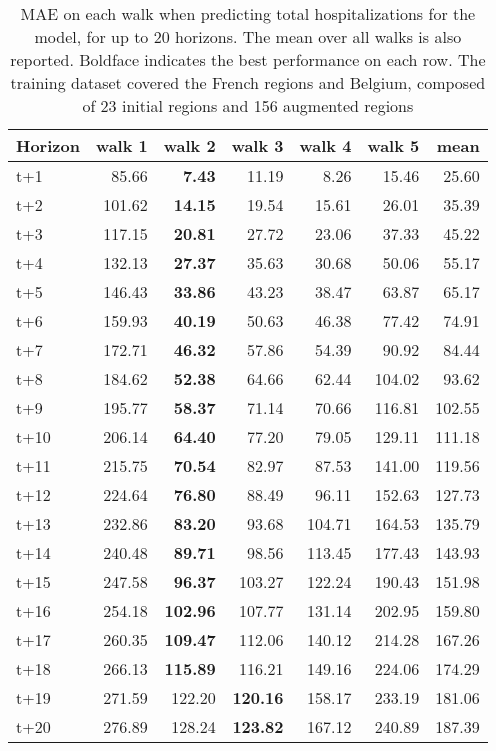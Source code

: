 \begin{table}[H]
\centering
\caption{MAE on each walk when predicting total hospitalizations for the model, for up to 20 horizons. The mean over all walks is also reported. Boldface indicates the best performance on each row. The training dataset covered the French regions and Belgium, composed of 23 initial regions and 156 augmented regions }
\label{tab:MAE_walk_baseline}
\begin{tabular}{lrrrrrr}
\toprule
Horizon &  walk 1 &  walk 2 &  walk 3 &  walk 4 &  walk 5 &   mean \\
\midrule
t+1  & 85.66  & \textbf{7.43}  & 11.19  & 8.26  & 15.46  & 25.60  \\
t+2  & 101.62  & \textbf{14.15}  & 19.54  & 15.61  & 26.01  & 35.39  \\
t+3  & 117.15  & \textbf{20.81}  & 27.72  & 23.06  & 37.33  & 45.22  \\
t+4  & 132.13  & \textbf{27.37}  & 35.63  & 30.68  & 50.06  & 55.17  \\
t+5  & 146.43  & \textbf{33.86}  & 43.23  & 38.47  & 63.87  & 65.17  \\
t+6  & 159.93  & \textbf{40.19}  & 50.63  & 46.38  & 77.42  & 74.91  \\
t+7  & 172.71  & \textbf{46.32}  & 57.86  & 54.39  & 90.92  & 84.44  \\
t+8  & 184.62  & \textbf{52.38}  & 64.66  & 62.44  & 104.02  & 93.62  \\
t+9  & 195.77  & \textbf{58.37}  & 71.14  & 70.66  & 116.81  & 102.55  \\
t+10  & 206.14  & \textbf{64.40}  & 77.20  & 79.05  & 129.11  & 111.18  \\
t+11  & 215.75  & \textbf{70.54}  & 82.97  & 87.53  & 141.00  & 119.56  \\
t+12  & 224.64  & \textbf{76.80}  & 88.49  & 96.11  & 152.63  & 127.73  \\
t+13  & 232.86  & \textbf{83.20}  & 93.68  & 104.71  & 164.53  & 135.79  \\
t+14  & 240.48  & \textbf{89.71}  & 98.56  & 113.45  & 177.43  & 143.93  \\
t+15  & 247.58  & \textbf{96.37}  & 103.27  & 122.24  & 190.43  & 151.98  \\
t+16  & 254.18  & \textbf{102.96}  & 107.77  & 131.14  & 202.95  & 159.80  \\
t+17  & 260.35  & \textbf{109.47}  & 112.06  & 140.12  & 214.28  & 167.26  \\
t+18  & 266.13  & \textbf{115.89}  & 116.21  & 149.16  & 224.06  & 174.29  \\
t+19  & 271.59  & 122.20  & \textbf{120.16}  & 158.17  & 233.19  & 181.06  \\
t+20  & 276.89  & 128.24  & \textbf{123.82}  & 167.12  & 240.89  & 187.39  \\

\bottomrule
\end{tabular}
\end{table}
